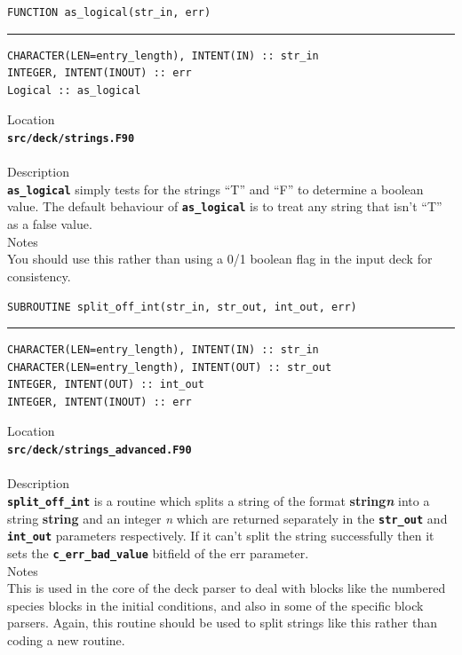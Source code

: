 \documentclass[12pt,a4paper]{article}
\newcommand{\HRule}{\rule{\linewidth}{0.5mm}}
\newcommand{\inlinecode}[1]{{\color{warwickred} \bf\texttt{#1}}}
\newcommand{\codedef}{\begin{Verbatim}[formatcom=\color{warwickred},fontsize=\Large,hfuzz=0pt]}
\newcommand{\coderule}{
{\color{warwickred}\vspace{-0.5cm}\HRule}
\codedef}
\begin{document}
\pagebreak
\codedef
FUNCTION as_logical(str_in, err)
\end{Verbatim}
\coderule
CHARACTER(LEN=entry_length), INTENT(IN) :: str_in
INTEGER, INTENT(INOUT) :: err
Logical :: as_logical
\end{Verbatim}
\vspace{1cm}
{\Large Location\\}
\inlinecode{src/deck/strings.F90}\\
\\[0.5cm]
{\Large Description\\}
\inlinecode{as\_logical} simply tests for the strings ``T'' and ``F'' to determine a
boolean value. The default behaviour of \inlinecode{as\_logical} is to treat any
string that isn't ``T'' as a false value.
\\[0.5cm]
{\Large Notes\\}
You should use this rather than using a 0/1 boolean flag in the input deck for
consistency.

\pagebreak
\codedef
SUBROUTINE split_off_int(str_in, str_out, int_out, err)
\end{Verbatim}
\coderule
CHARACTER(LEN=entry_length), INTENT(IN) :: str_in
CHARACTER(LEN=entry_length), INTENT(OUT) :: str_out
INTEGER, INTENT(OUT) :: int_out
INTEGER, INTENT(INOUT) :: err
\end{Verbatim}
\vspace{1cm}
{\Large Location\\}
\inlinecode{src/deck/strings\_advanced.F90}\\
\\[0.5cm]
{\Large Description\\}
\inlinecode{split\_off\_int} is a routine which splits a string of the format {\bf
string{\it n}} into a string {\bf string} and an integer {\it n} which are
returned separately in the \inlinecode{str\_out} and \inlinecode{int\_out}
parameters respectively.  If it can't split the string successfully then it
sets the \inlinecode{c\_err\_bad\_value} bitfield of the err parameter.
\\[0.5cm]
{\Large Notes\\}
This is used in the core of the deck parser to deal with blocks like the
numbered species blocks in the initial conditions, and also in some of the
specific block parsers. Again, this routine should be used to split strings
like this rather than coding a new routine.
\end{document}
